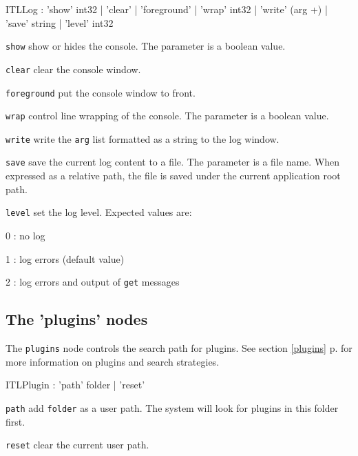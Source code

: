 \documentclass[a4paper,twoside]{report}
\newcommand{\subsublevel}[1]	{\subsection{#1}}
\newcommand{\fullref}[1]	{\ref{#1} p.\pageref{#1}}
\newcommand{\OSC}[1]		{\texttt{#1}}
\let\olditemize\itemize
\let\oldenditemize\enditemize
\renewenvironment{itemize} 	{\olditemize \setlength{\itemsep}{1mm}}{\oldenditemize}
\begin{document}
\begin{rail}
ITLLog : 'show'  int32
		| 'clear'
		| 'foreground'
		| 'wrap' int32
		| 'write' (arg +)
		| 'save' string
		| 'level' int32
\end{rail}

\begin{itemize}
\item \OSC{show} show or hides the console. The parameter is a boolean value.
\item \OSC{clear} clear the console window.
\item \OSC{foreground} put the console window to front.
\item \OSC{wrap} control line wrapping of the console. The parameter is a boolean value.
\item \OSC{write} write the \OSC{arg} list formatted as a string to the log window.
\item \OSC{save} save the current log content to a file. The parameter is a file name. When expressed as a relative path, the file is saved under the current application root path.
\item \OSC{level} set the log level. Expected values are: 
\begin{itemize}
\item 0 : no log
\item 1 : log errors (default value)
\item 2 : log errors and output of \OSC{get} messages
\end{itemize}
\end{itemize}



\subsublevel{The 'plugins' nodes}
\label{ITLplugins}

The \OSC{plugins} node controls the search path for plugins. See section \fullref{plugins} for more information on plugins and search strategies.

\begin{rail}
ITLPlugin : 'path'  folder
		| 'reset'
\end{rail}

\begin{itemize}
\item \OSC{path} add \OSC{folder} as a user path. The system will look for plugins in this folder first.
\item \OSC{reset} clear the current user path.
\end{itemize}
\end{document}
